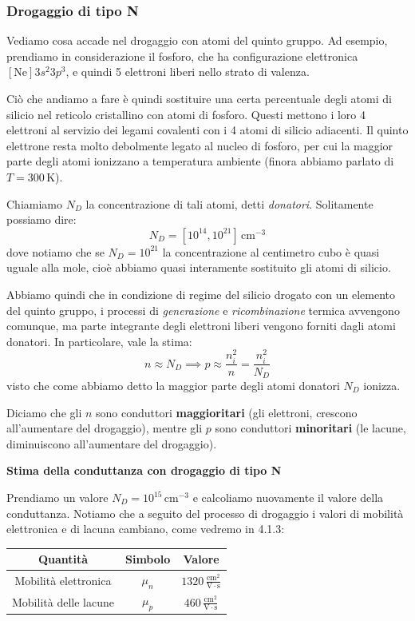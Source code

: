 \documentclass[a4paper,11pt]{article}
\begin{document}
\subsubsection{Drogaggio di tipo N}
Vediamo cosa accade nel drogaggio con atomi del quinto gruppo. Ad esempio, prendiamo in considerazione il fosforo, che ha configurazione elettronica $[\mathrm{Ne}] 3s^2 3p^3$, e quindi 5 elettroni liberi nello strato di valenza. 

Ciò che andiamo a fare è quindi sostituire una certa percentuale degli atomi di silicio nel reticolo cristallino con atomi di fosforo. Questi mettono i loro 4 elettroni al servizio dei legami covalenti con i 4 atomi di silicio adiacenti. Il quinto elettrone resta molto debolmente legato al nucleo di fosforo, per cui la maggior parte degli atomi ionizzano a temperatura ambiente (finora abbiamo parlato di $T = 300 \, \mathrm{K}$). 

Chiamiamo $N_D$ la concentrazione di tali atomi, detti \textit{donatori}. Solitamente possiamo dire:
$$
N_D = [10^{14}, 10^{21}] \, \mathrm{cm}^{-3}
$$
dove notiamo che se $N_D = 10^{21}$ la concentrazione al centimetro cubo è quasi uguale alla mole, cioè abbiamo quasi interamente sostituito gli atomi di silicio. 

Abbiamo quindi che in condizione di regime del silicio drogato con un elemento del quinto gruppo, i processi di \textit{generazione} e \textit{ricombinazione} termica avvengono comunque, ma parte integrante degli elettroni liberi vengono forniti dagli atomi donatori. In particolare, vale la stima:
$$
n \approx N_D \implies p \approx \frac{n_i^2}{n} = \frac{n_i^2}{N_D}
$$
visto che come abbiamo detto la maggior parte degli atomi donatori $N_D$ ionizza.

Diciamo che gli $n$ sono conduttori \textbf{maggioritari} (gli elettroni, crescono all'aumentare del drogaggio), mentre gli $p$ sono conduttori \textbf{minoritari} (le lacune, diminuiscono all'aumentare del drogaggio).

\par\smallskip

\noindent
\textbf{\textsf{Stima della conduttanza con drogaggio di tipo N}}

\noindent
Prendiamo un valore $N_D = 10^{15} \, \mathrm{cm}^{-3}$ e calcoliamo nuovamente il valore della conduttanza. Notiamo che a seguito del processo di drogaggio i valori di mobilità elettronica e di lacuna cambiano, come vedremo in 4.1.3:
\begin{table}[H]
	\center {}
	\begin{tabular} { c | c | c  }
		\bfseries Quantità & \bfseries Simbolo & \bfseries Valore \\
		\hline 
		Mobilità elettronica & $\mu_n$ & $1320  \, \frac{\mathrm{cm}^2}{\mathrm{V} \cdot \mathrm{s}}$ \\
		Mobilità delle lacune & $\mu_p$ & $460  \, \frac{\mathrm{cm}^2}{\mathrm{V} \cdot \mathrm{s}}$
	\end{tabular}
\end{table}
\end{document}
